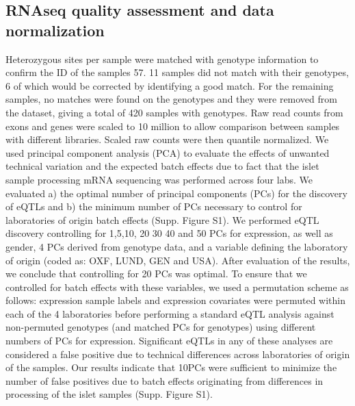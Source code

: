 \subsection{RNAseq quality assessment and data normalization}
Heterozygous sites per sample were matched with genotype information to confirm the ID of the samples 57. 11 samples did not match with their genotypes, 6 of which would be corrected by identifying a good match. For the remaining samples, no matches were found on the genotypes and they were removed from the dataset, giving a total of 420 samples with genotypes.
Raw read counts from exons and genes were scaled to 10 million to allow comparison between samples with different libraries. Scaled raw counts were then quantile normalized. We used principal component analysis (PCA) to evaluate the effects of unwanted technical variation and the expected batch effects due to fact that the islet sample processing mRNA sequencing was performed across four labs. We evaluated a) the optimal number of principal components (PCs) for the discovery of eQTLs and b) the minimum number of PCs necessary to control for laboratories of origin batch effects (Supp. Figure S1). We performed eQTL discovery controlling for 1,5,10, 20 30 40 and 50 PCs for expression, as well as gender, 4 PCs derived from genotype data, and a variable defining the laboratory of origin (coded as: OXF, LUND, GEN and USA). After evaluation of the results, we conclude that controlling for 20 PCs was optimal. To ensure that we controlled for batch effects with these variables, we used a permutation scheme as follows: expression sample labels and expression covariates were permuted within each of the 4 laboratories before performing a standard eQTL analysis against non-permuted genotypes (and matched PCs for genotypes) using different numbers of PCs for expression. Significant eQTLs in any of these analyses are considered a false positive due to technical differences across laboratories of origin of the samples. Our results indicate that 10PCs were sufficient to minimize the number of false positives due to batch effects originating from differences in processing of the islet samples (Supp. Figure S1).	

